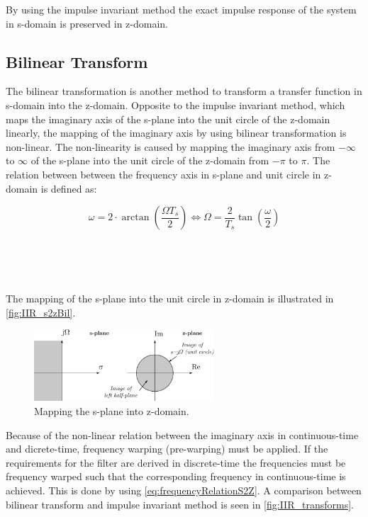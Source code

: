 By using the impulse invariant method the exact impulse response of the system in s-domain is preserved in z-domain.


\subsection{Bilinear Transform}

The bilinear transformation is another method to transform a transfer function in s-domain into the z-domain. Opposite to the impulse invariant method, which maps the imaginary axis of the s-plane into the unit circle of the z-domain linearly, the mapping of the imaginary axis by using bilinear transformation is non-linear. The non-linearity is caused by mapping the imaginary axis from $-\infty$ to $\infty$ of the s-plane into the unit circle of the z-domain from $-\pi$ to $\pi$. The relation between between the frequency axis in s-plane and unit circle in z-domain is defined as:

\begin{equation} \label{eq:frequencyRelationS2Z}
\omega = 2 \cdot \arctan \left( \frac{\Omega T_s}{2} \right) \Leftrightarrow \Omega = \frac{2}{T_s} \tan \left( \frac{\omega}{2} \right)
\end{equation}
\begin{where}
\\
\\
\\
\end{where}


The mapping of the s-plane into the unit circle in z-domain is illustrated in \autoref{fig:IIR_s2zBil}.

\begin{figure}[H]
\centering
\includegraphics[width=0.6\textwidth]{figures/IIR_s2zBil}
\caption{Mapping the s-plane into z-domain.}
\label{fig:IIR_s2zBil}
\end{figure}

Because of the non-linear relation between the imaginary axis in continuous-time and dicrete-time, frequency warping (pre-warping) must be applied. If the requirements for the filter are derived in discrete-time the frequencies must be frequency warped such that the corresponding frequency in continuous-time is achieved. This is done by using \autoref{eq:frequencyRelationS2Z}. A comparison between bilinear transform and impulse invariant method is seen in \autoref{fig:IIR_transforms}. 


